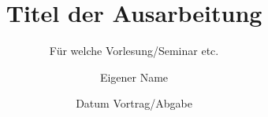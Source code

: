 \documentclass[%
	,ngerman					%
	,fontsize	= 12pt		%
	,parskip	= half-		%
	,BCOR		= 10mm		%
	,leqno					%
	,abstract	= true		%
	,headings	= small		%
	,DIV		= calc		%
	]{scrartcl}   			%
\begin{document}
\pagestyle{headings}
\title{Titel der Ausarbeitung}
\subtitle{Für welche Vorlesung/Seminar etc.}
\author{Eigener Name}
\date{Datum Vortrag/Abgabe} %

\thispagestyle{empty}
\maketitle
\end{document}
